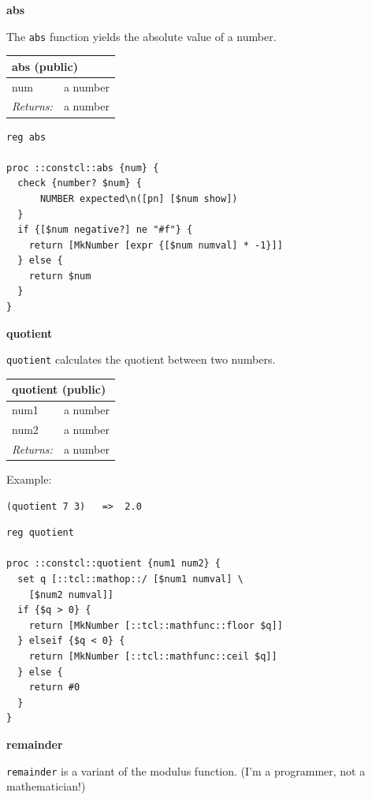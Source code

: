 \documentclass[twoside,9pt]{report}
\begin{document}
\textbf{abs}


The \texttt{abs} function yields the absolute value of a number.

\begin{tabular}{ |l l| }
\hline
\multicolumn{2}{|l|}{abs (public)} \\
\hline
num & a number \\
\textit{Returns:} & a number \\
\hline
\end{tabular}

\noindent\makebox[\linewidth]{\rule{\linewidth}{0.4pt}}
\begin{lstlisting}
reg abs
 
proc ::constcl::abs {num} {
  check {number? $num} {
      NUMBER expected\n([pn] [$num show])
  }
  if {[$num negative?] ne "#f"} {
    return [MkNumber [expr {[$num numval] * -1}]]
  } else {
    return $num
  }
}
\end{lstlisting}
\noindent\makebox[\linewidth]{\rule{\linewidth}{0.4pt}}

\textbf{quotient}


\texttt{quotient} calculates the quotient between two numbers.

\begin{tabular}{ |l l| }
\hline
\multicolumn{2}{|l|}{quotient (public)} \\
\hline
num1 & a number \\
num2 & a number \\
\textit{Returns:} & a number \\
\hline
\end{tabular}


Example:

\noindent\makebox[\linewidth]{\rule{\linewidth}{0.4pt}}
\begin{lstlisting}
(quotient 7 3)   =>  2.0
\end{lstlisting}
\noindent\makebox[\linewidth]{\rule{\linewidth}{0.4pt}}
\noindent\makebox[\linewidth]{\rule{\linewidth}{0.4pt}}
\begin{lstlisting}
reg quotient
 
proc ::constcl::quotient {num1 num2} {
  set q [::tcl::mathop::/ [$num1 numval] \
    [$num2 numval]]
  if {$q > 0} {
    return [MkNumber [::tcl::mathfunc::floor $q]]
  } elseif {$q < 0} {
    return [MkNumber [::tcl::mathfunc::ceil $q]]
  } else {
    return #0
  }
}
\end{lstlisting}
\noindent\makebox[\linewidth]{\rule{\linewidth}{0.4pt}}

\textbf{remainder}


\texttt{remainder} is a variant of the modulus function. (I'm a programmer, not a mathematician!)
\end{document}
